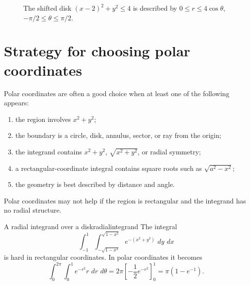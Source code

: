 \documentclass[11pt]{article}
\newcommand{\dd}{\,d}
\begin{document}
\begin{figure}[H]
\centering
{}
\caption{The shifted disk $(x-2)^2+y^2\le4$ is described by $0\le r\le4\cos\theta$, $-\pi/2\le\theta\le\pi/2$.}
\end{figure}

\section{Strategy for choosing polar coordinates}

Polar coordinates are often a good choice when at least one of the following appears:
\begin{enumerate}
  \item the region involves $x^2+y^2$;
  \item the boundary is a circle, disk, annulus, sector, or ray from the origin;
  \item the integrand contains $x^2+y^2$, $\sqrt{x^2+y^2}$, or radial symmetry;
  \item a rectangular-coordinate integral contains square roots such as $\sqrt{a^2-x^2}$;
  \item the geometry is best described by distance and angle.
\end{enumerate}
Polar coordinates may not help if the region is rectangular and the integrand has no radial structure.

\begin{workedexample}{A radial integrand over a disk}{radialintegrand}
The integral
\[
\int_{-1}^{1}\int_{-\sqrt{1-x^2}}^{\sqrt{1-x^2}} e^{-(x^2+y^2)}\,\dd y\,\dd x
\]
is hard in rectangular coordinates. In polar coordinates it becomes
\[
\int_0^{2\pi}\int_0^1 e^{-r^2}r\,\dd r\,\dd\theta
=2\pi\left[-\frac12e^{-r^2}\right]_0^1=\pi(1-e^{-1}).
\]
\end{workedexample}
\end{document}
